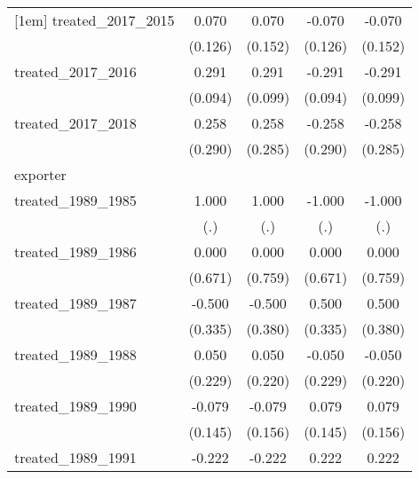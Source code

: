 {\begin{tabular}{l*{4}{c}}
[1em]
treated\_2017\_2015&       0.070         &       0.070         &      -0.070         &      -0.070         \\
            &     (0.126)         &     (0.152)         &     (0.126)         &     (0.152)         \\
[1em]
treated\_2017\_2016&       0.291\sym{**} &       0.291\sym{**} &      -0.291\sym{**} &      -0.291\sym{**} \\
            &     (0.094)         &     (0.099)         &     (0.094)         &     (0.099)         \\
[1em]
treated\_2017\_2018&       0.258         &       0.258         &      -0.258         &      -0.258         \\
            &     (0.290)         &     (0.285)         &     (0.290)         &     (0.285)         \\
\hline
exporter    &                     &                     &                     &                     \\
treated\_1989\_1985&       1.000         &       1.000         &      -1.000         &      -1.000         \\
            &         (.)         &         (.)         &         (.)         &         (.)         \\
[1em]
treated\_1989\_1986&       0.000         &       0.000         &       0.000         &       0.000         \\
            &     (0.671)         &     (0.759)         &     (0.671)         &     (0.759)         \\
[1em]
treated\_1989\_1987&      -0.500         &      -0.500         &       0.500         &       0.500         \\
            &     (0.335)         &     (0.380)         &     (0.335)         &     (0.380)         \\
[1em]
treated\_1989\_1988&       0.050         &       0.050         &      -0.050         &      -0.050         \\
            &     (0.229)         &     (0.220)         &     (0.229)         &     (0.220)         \\
[1em]
treated\_1989\_1990&      -0.079         &      -0.079         &       0.079         &       0.079         \\
            &     (0.145)         &     (0.156)         &     (0.145)         &     (0.156)         \\
[1em]
treated\_1989\_1991&      -0.222         &      -0.222         &       0.222         &       0.222         \\

\end{tabular}}
